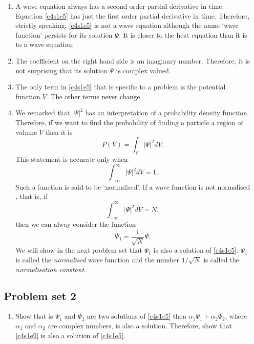 \begin{enumerate}
\item A wave equation always has a second order partial derivative in time.
Equation \eqref{c4s1e5} has just the first order partial derivative in time.
Therefore, strictly speaking, \eqref{c4s1e5} is not a wave equation although
the name `wave function' persists for its solution $\Psi$. It is closer to the
heat equation than it is to a wave equation.
\item The coefficient on the right hand side is an imaginary number. Therefore,
it is not surprising that its solution $\Psi$ is complex valued.
\item The only term in \eqref{c4s1e5} that is specific to a problem is the
potential function $V$. The other terms never change.
\item We remarked that $|\Psi|^2$ has an interpretation of a probability
density function. Therefore, if we want to find the probability of finding
a particle a region of volume $V$ then it is
\begin{equation}\label{c4s1e6}
P(V) = \int_V |\Psi|^2 dV.
\end{equation}
This statement is accurate only when 
\begin{equation}\label{c4s1e7}
\int_{-\infty}^\infty |\Psi|^2dV = 1.
\end{equation}
Such a function is said to be `normalised'. If a wave function is not normalised
, that is, if
\begin{equation}\label{c4s1e8}
\int_{-\infty}^\infty |\Psi|^2dV = N,
\end{equation}
then we can alway consider the function
\begin{equation}\label{c4s1e9}
\Psi_1 = \frac{1}{\sqrt{N}}\Psi.
\end{equation}
We will show in the next problem set that $\Psi_1$ is also a solution of 
\eqref{c4s1e5}. $\Psi_1$ is called the \emph{normalised} wave function and
the number $1/\sqrt{N}$ is called the \emph{normalisation constant}.
\end{enumerate}

\subsection{Problem set 2}
\begin{enumerate}
\item Show that is $\Psi_1$ and $\Psi_2$ are two solutions of \eqref{c4s1e5} 
then $\alpha_1\Psi_1 + \alpha_2\Psi_2$, where $\alpha_1$ and $\alpha_2$ are
complex numbers, is also a solution. Therefore, show that \eqref{c4s1e9} is
also a solution of \eqref{c4s1e5}.
\end{enumerate}

